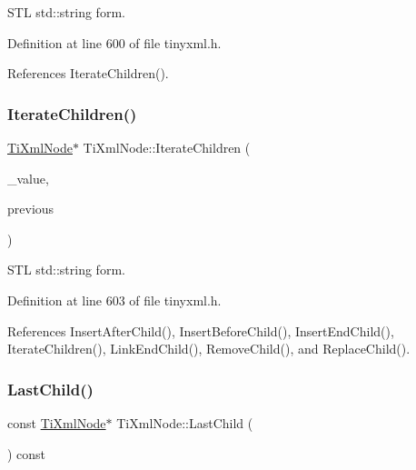 S\+TL std\+::string form. 



Definition at line 600 of file tinyxml.\+h.



References Iterate\+Children().

\hypertarget{class_ti_xml_node_a16e9ad53e2f5445b14bf325c90aa862c}{}\label{class_ti_xml_node_a16e9ad53e2f5445b14bf325c90aa862c} 
\subsubsection{\texorpdfstring{Iterate\+Children()}{IterateChildren()}\hspace{0.1cm}{\footnotesize\ttfamily [6/6]}}
{\footnotesize\ttfamily \hyperlink{class_ti_xml_node}{Ti\+Xml\+Node}$\ast$ Ti\+Xml\+Node\+::\+Iterate\+Children (\begin{DoxyParamCaption}\item[{const std\+::string \&}]{\+\_\+value,  }\item[{const \hyperlink{class_ti_xml_node}{Ti\+Xml\+Node} $\ast$}]{previous }\end{DoxyParamCaption})\hspace{0.3cm}{\ttfamily [inline]}}



S\+TL std\+::string form. 



Definition at line 603 of file tinyxml.\+h.



References Insert\+After\+Child(), Insert\+Before\+Child(), Insert\+End\+Child(), Iterate\+Children(), Link\+End\+Child(), Remove\+Child(), and Replace\+Child().

\hypertarget{class_ti_xml_node_af3a04120b1ed2fead2f4bb72cbea845e}{}\label{class_ti_xml_node_af3a04120b1ed2fead2f4bb72cbea845e} 
\subsubsection{\texorpdfstring{Last\+Child()}{LastChild()}\hspace{0.1cm}{\footnotesize\ttfamily [1/6]}}
{\footnotesize\ttfamily const \hyperlink{class_ti_xml_node}{Ti\+Xml\+Node}$\ast$ Ti\+Xml\+Node\+::\+Last\+Child (\begin{DoxyParamCaption}{ }\end{DoxyParamCaption}) const\hspace{0.3cm}{\ttfamily [inline]}}



